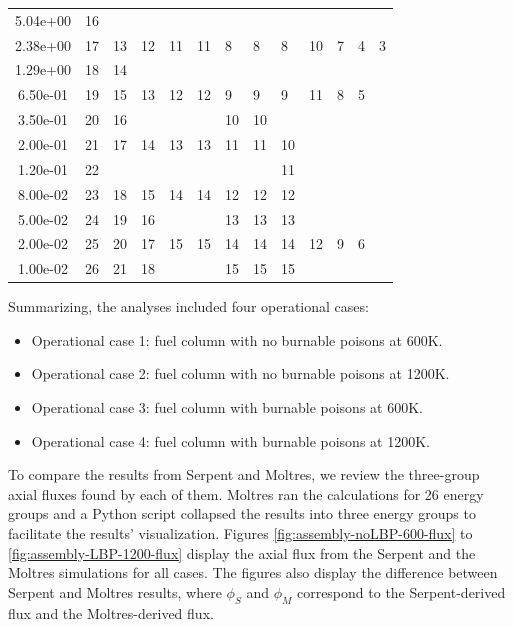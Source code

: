 \begin{table}[htbp!]
\begin{tabular}{S[table-format=2.2e-1]|llllllllllll}
  5.04e+00            & 16    &      &      &     &     &     &     &       &     &    &    &   \\ 
  2.38e+00            & 17    & 13   & 12   & 11  & 11  & 8   & 8   & 8     & 10  & 7  & 4  & 3 \\ 
  1.29e+00            & 18    & 14   &      &     &     &     &     &       &     &    &    &   \\ 
  6.50e-01            & 19    & 15   & 13   & 12  & 12  & 9   & 9   & 9     & 11  & 8  & 5  &   \\ 
  3.50e-01            & 20    & 16   &      &     &     & 10  & 10  &       &     &    &    &   \\ 
  2.00e-01            & 21    & 17   & 14   & 13  & 13  & 11  & 11  & 10    &     &    &    &   \\ 
  1.20e-01            & 22    &      &      &     &     &     &     & 11    &     &    &    &   \\ 
  8.00e-02            & 23    & 18   & 15   & 14  & 14  & 12  & 12  & 12    &     &    &    &   \\ 
  5.00e-02            & 24    & 19   & 16   &     &     & 13  & 13  & 13    &     &    &    &   \\ 
  2.00e-02            & 25    & 20   & 17   & 15  & 15  & 14  & 14  & 14    & 12  & 9  & 6  &   \\ 
  1.00e-02            & 26    & 21   & 18   &     &     & 15  & 15  & 15    &     &    &    &   \\ 
  \bottomrule
  \end{tabular}
  \label{tab:energygroups}
\end{table}

Summarizing, the analyses included four operational cases: 
\begin{itemize}
  \item Operational case 1: fuel column with no burnable poisons at 600K.
  \item Operational case 2: fuel column with no burnable poisons at 1200K.
  \item Operational case 3: fuel column with burnable poisons at 600K.
  \item Operational case 4: fuel column with burnable poisons at 1200K.
\end{itemize}

To compare the results from Serpent and Moltres, we review the three-group axial fluxes found by each of them.
Moltres ran the calculations for 26 energy groups and a Python script collapsed the results into three energy groups to facilitate the results' visualization.
Figures \ref{fig:assembly-noLBP-600-flux} to \ref{fig:assembly-LBP-1200-flux} display the axial flux from the Serpent and the Moltres simulations for all cases.
The figures also display the difference between Serpent and Moltres results, where $\phi_S$ and $\phi_M$ correspond to the Serpent-derived flux and the Moltres-derived flux.


